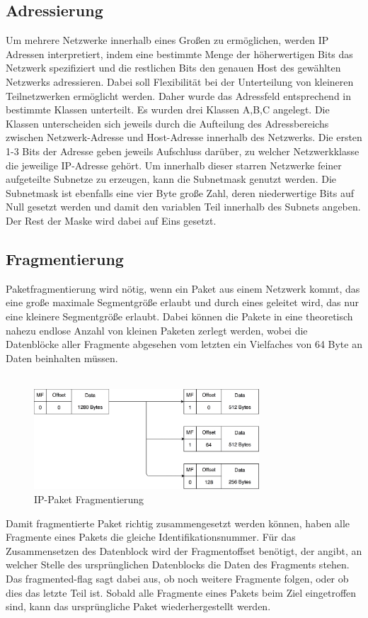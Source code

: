 \subsection{Adressierung}
Um mehrere Netzwerke innerhalb eines Großen zu ermöglichen, werden IP Adressen interpretiert, indem eine bestimmte Menge der höherwertigen Bits das Netzwerk spezifiziert und die restlichen Bits den genauen Host des gewählten Netzwerks adressieren. Dabei soll Flexibilität bei der Unterteilung von kleineren Teilnetzwerken ermöglicht werden. Daher wurde das Adressfeld entsprechend in bestimmte Klassen unterteilt. Es wurden drei Klassen A,B,C angelegt. Die Klassen unterscheiden sich jeweils durch die Aufteilung des Adressbereichs zwischen Netzwerk-Adresse und Host-Adresse innerhalb des Netzwerks. Die ersten 1-3 Bits der Adresse geben jeweils Aufschluss darüber, zu welcher Netzwerkklasse die jeweilige IP-Adresse gehört. Um innerhalb dieser starren Netzwerke feiner aufgeteilte Subnetze zu erzeugen, kann die Subnetmask genutzt werden. Die Subnetmask ist ebenfalls eine vier Byte große Zahl, deren niederwertige Bits auf Null gesetzt werden und damit den variablen Teil innerhalb des Subnets angeben. Der Rest der Maske wird dabei auf Eins gesetzt.\cite{IPrfc}

\subsection{Fragmentierung}

Paketfragmentierung wird nötig, wenn ein Paket aus einem Netzwerk kommt, das eine große maximale Segmentgröße erlaubt und durch eines geleitet wird, das nur eine kleinere Segmentgröße erlaubt. Dabei können die Pakete in eine theoretisch nahezu endlose Anzahl von kleinen Paketen zerlegt werden, wobei die Datenblöcke aller Fragmente abgesehen vom letzten ein Vielfaches von 64 Byte an Daten beinhalten müssen.\\\\
\begin{figure}[htp]
	\centering
	\includegraphics[width=0.75\textwidth]{Graphics/IPfragmentation.png}
	\caption{IP-Paket Fragmentierung}
\end{figure}
Damit fragmentierte Paket richtig zusammengesetzt werden können, haben alle Fragmente eines Pakets die gleiche Identifikationsnummer. Für das Zusammensetzen des Datenblock wird der Fragmentoffset benötigt, der angibt, an welcher Stelle des ursprünglichen Datenblocks die Daten des Fragments stehen. Das fragmented-flag sagt dabei aus, ob noch weitere Fragmente folgen, oder ob dies das letzte Teil ist. Sobald alle Fragmente eines Pakets beim Ziel eingetroffen sind, kann das ursprüngliche Paket wiederhergestellt werden.\cite{IPrfc} 

